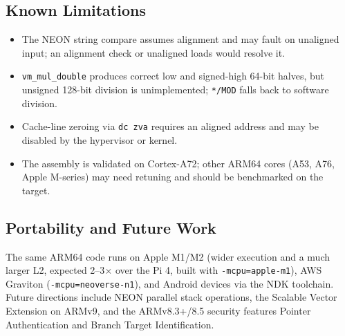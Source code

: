 \subsection{Known Limitations}

\begin{itemize}
  \item The NEON string compare assumes alignment and may fault on unaligned
    input; an alignment check or unaligned loads would resolve it.
  \item \texttt{vm\_mul\_double} produces correct low and signed-high 64-bit
    halves, but unsigned 128-bit division is unimplemented; \texttt{*/MOD}
    falls back to software division.
  \item Cache-line zeroing via \texttt{dc zva} requires an aligned address and
    may be disabled by the hypervisor or kernel.
  \item The assembly is validated on Cortex-A72; other ARM64 cores (A53, A76,
    Apple M-series) may need retuning and should be benchmarked on the target.
\end{itemize}

\subsection{Portability and Future Work}

The same ARM64 code runs on Apple M1/M2 (wider execution and a much larger L2,
expected 2--3$\times$ over the Pi 4, built with \texttt{-mcpu=apple-m1}), AWS
Graviton (\texttt{-mcpu=neoverse-n1}), and Android devices via the NDK
toolchain. Future directions include NEON parallel stack operations, the
Scalable Vector Extension on ARMv9, and the ARMv8.3+/8.5 security features
Pointer Authentication and Branch Target Identification.
